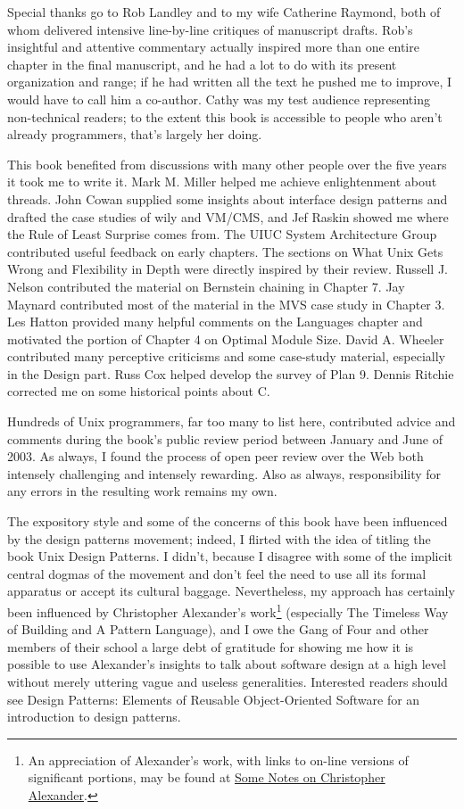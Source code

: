 \documentclass[12pt,oneside]{book}
\begin{document}
\begin{common-format}
Special thanks go to Rob Landley and to my wife Catherine Raymond, both of whom delivered intensive line-by-line critiques of manuscript drafts. Rob's insightful and attentive commentary actually inspired more than one entire chapter in the final manuscript, and he had a lot to do with its present organization and range; if he had written all the text he pushed me to improve, I would have to call him a co-author. Cathy was my test audience representing non-technical readers; to the extent this book is accessible to people who aren't already programmers, that's largely her doing.

This book benefited from discussions with many other people over the five years it took me to write it. Mark M. Miller helped me achieve enlightenment about threads. John Cowan supplied some insights about interface design patterns and drafted the case studies of wily and VM/CMS, and Jef Raskin showed me where the Rule of Least Surprise comes from. The UIUC System Architecture Group contributed useful feedback on early chapters. The sections on What Unix Gets Wrong and Flexibility in Depth were directly inspired by their review. Russell J. Nelson contributed the material on Bernstein chaining in Chapter 7. Jay Maynard contributed most of the material in the MVS case study in Chapter 3. Les Hatton provided many helpful comments on the Languages chapter and motivated the portion of Chapter 4 on Optimal Module Size. David A. Wheeler contributed many perceptive criticisms and some case-study material, especially in the Design part. Russ Cox helped develop the survey of Plan 9. Dennis Ritchie corrected me on some historical points about C.

Hundreds of Unix programmers, far too many to list here, contributed advice and comments during the book's public review period between January and June of 2003. As always, I found the process of open peer review over the Web both intensely challenging and intensely rewarding. Also as always, responsibility for any errors in the resulting work remains my own.

The expository style and some of the concerns of this book have been influenced by the design patterns movement; indeed, I flirted with the idea of titling the book Unix Design Patterns. I didn't, because I disagree with some of the implicit central dogmas of the movement and don't feel the need to use all its formal apparatus or accept its cultural baggage. Nevertheless, my approach has certainly been influenced by Christopher Alexander's work\footnote{An appreciation of Alexander's work, with links to on-line versions of significant portions, may be found at \href{http://www.math.utsa.edu/sphere/salingar/Chris.text.html}{Some Notes on Christopher Alexander}.} (especially The Timeless Way of Building and A Pattern Language), and I owe the Gang of Four and other members of their school a large debt of gratitude for showing me how it is possible to use Alexander's insights to talk about software design at a high level without merely uttering vague and useless generalities. Interested readers should see Design Patterns: Elements of Reusable Object-Oriented Software \cite{GangOfFour} for an introduction to design patterns.


\end{common-format}
\end{document}
